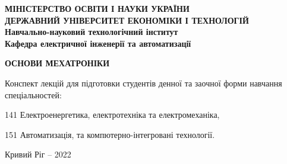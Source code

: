 \begin{titlepage}
 \begin{center}
  \textbf{МІНІСТЕРСТВО ОСВІТИ І НАУКИ УКРАЇНИ} \\
  \textbf{ДЕРЖАВНИЙ УНІВЕРСИТЕТ ЕКОНОМІКИ І ТЕХНОЛОГІЙ} \\
  \textbf{Навчально-науковий технологічний інститут} \\
  \textbf{Кафедра електричної інженерії та автоматизації}
 
\vspace{5.0em}

\large { \textbf{ОСНОВИ МЕХАТРОНІКИ}}

Конспект лекцій для підготовки студентів денної та заочної форми навчання спеціальностей: 

141 Електроенергетика, електротехніка та електромеханіка,

151 Автоматизація, та компютерно-інтегровані технології.

\vspace{14cm}

 Кривий Ріг -- 2022
\end{center}
\end{titlepage}